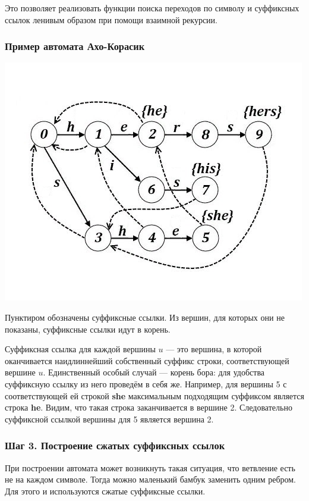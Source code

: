 Это позволяет реализовать функции поиска переходов по символу и суффиксных ссылок ленивым образом при помощи взаимной рекурсии.

\subsubsection{Пример автомата Ахо-Корасик}

\includegraphics[]{img/9_2.jpg}

Пунктиром обозначены суффиксные ссылки.
Из вершин, для которых они не показаны, суффиксные ссылки идут в корень.

Суффиксная ссылка для каждой вершины $u$ --- это вершина, в которой оканчивается наидлиннейший собственный суффикс строки, соответствующей вершине $u$.
Единственный особый случай --- корень бора: для удобства суффиксную ссылку из него проведём в себя же.
Например, для вершины 5 с соответствующей ей строкой \textbf{she} максимальным подходящим суффиксом является строка \textbf{he}.
Видим, что такая строка заканчивается в вершине 2.
Следовательно суффиксной ссылкой вершины для 5 является вершина 2. 

\subsubsection{Шаг 3. Построение сжатых суффиксных ссылок}

При построении автомата может возникнуть такая ситуация, что ветвление есть не на каждом символе.
Тогда можно маленький бамбук заменить одним ребром.
Для этого и используются сжатые суффиксные ссылки.

